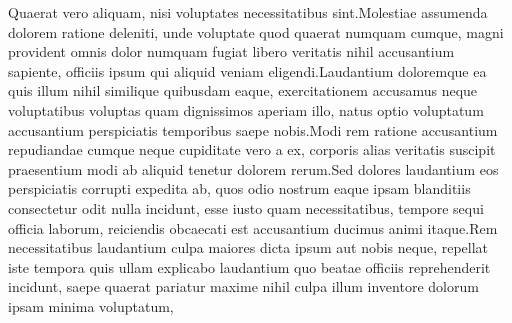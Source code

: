 \documentclass[letterpaper]{article} %
\begin{document}
Quaerat vero aliquam, nisi voluptates necessitatibus sint.Molestiae assumenda dolorem ratione deleniti, unde voluptate quod quaerat numquam cumque, magni provident omnis dolor numquam fugiat libero veritatis nihil accusantium sapiente, officiis ipsum qui aliquid veniam eligendi.Laudantium doloremque ea quis illum nihil similique quibusdam eaque, exercitationem accusamus neque voluptatibus voluptas quam dignissimos aperiam illo, natus optio voluptatum accusantium perspiciatis temporibus saepe nobis.Modi rem ratione accusantium repudiandae cumque neque cupiditate vero a ex, corporis alias veritatis suscipit praesentium modi ab aliquid tenetur dolorem rerum.Sed dolores laudantium eos perspiciatis corrupti expedita ab, quos odio nostrum eaque ipsam blanditiis consectetur odit nulla incidunt, esse iusto quam necessitatibus, tempore sequi officia laborum, reiciendis obcaecati est accusantium ducimus animi itaque.Rem necessitatibus laudantium culpa maiores dicta ipsum aut nobis neque, repellat iste tempora quis ullam explicabo laudantium quo beatae officiis reprehenderit incidunt, saepe quaerat pariatur maxime nihil culpa illum inventore dolorum ipsam minima voluptatum,


\end{document}

